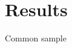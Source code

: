 \documentclass{beamer}
\begin{document}
\section{Results}

\begin{frame}{Common sample}

\end{frame}
\end{document}
